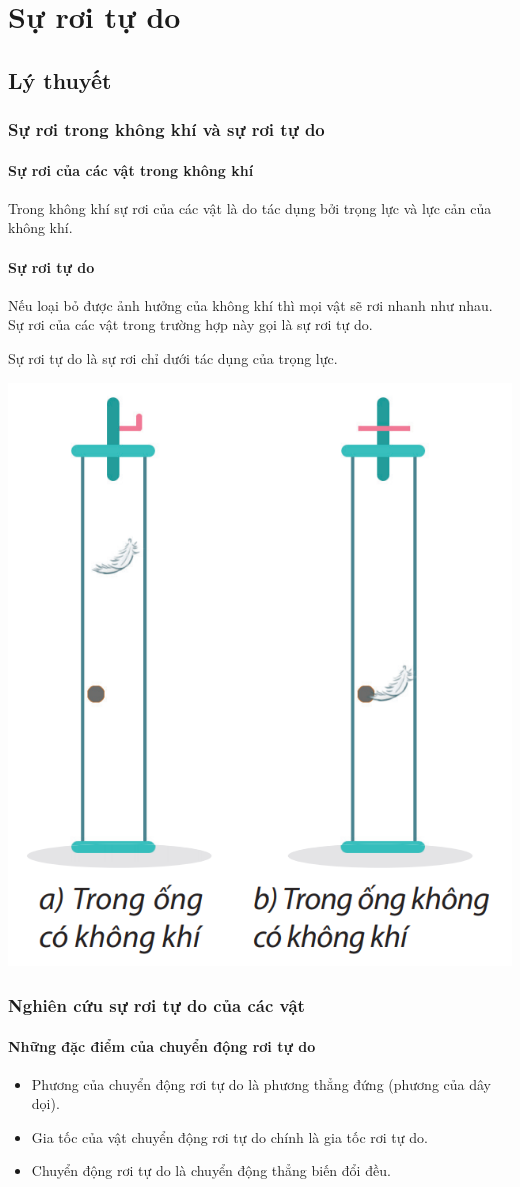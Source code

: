 \let\lesson\undefined
\newcommand{\lesson}{\phantomlesson{Bài 8: Sự rơi tự do}}
\chapter[Sự rơi tự do]{Sự rơi tự do}
\setcounter{section}{0}
\section{Lý thuyết}
\subsection{Sự rơi trong không khí và sự rơi tự do}
\subsubsection{Sự rơi của các vật trong không khí}
Trong không khí sự rơi của các vật là do tác dụng bởi trọng lực và lực cản của không khí.
\subsubsection{Sự rơi tự do }
Nếu loại bỏ được ảnh hưởng của không khí thì mọi vật sẽ rơi nhanh như nhau. Sự rơi của các vật trong trường hợp này gọi là sự rơi tự do.

Sự rơi tự do là sự rơi chỉ dưới tác dụng của trọng lực.
\begin{center}
	\includegraphics[width=0.25\linewidth]{../figs/VN10-2023-PH-TP011-1}
\end{center}
\subsection{Nghiên cứu sự rơi tự do của các vật}
\subsubsection{Những đặc điểm của chuyển động rơi tự do}
\begin{itemize}
	\item Phương của chuyển động rơi tự do là phương thẳng đứng (phương của dây dọi).
	\item Gia tốc của vật chuyển động rơi tự do chính là gia tốc rơi tự do.
	\item Chuyển động rơi tự do là chuyển động thẳng biến đổi đều.
\end{itemize}	

